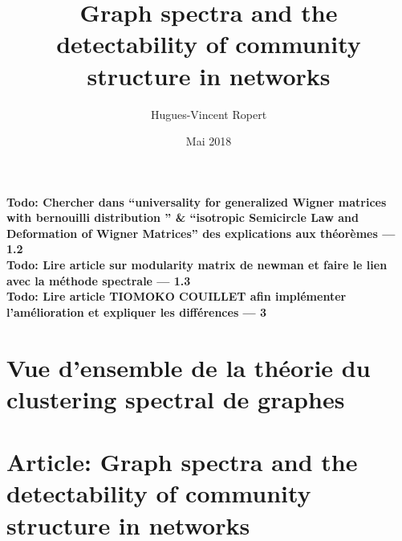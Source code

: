\documentclass{article} %
\title{Graph spectra and the detectability of community structure in networks}
\author{Hugues-Vincent Ropert}
\date{Mai 2018}
\begin{document}
\maketitle

\textbf{Todo: Chercher dans ``universality for generalized Wigner matrices with bernouilli distribution '' \& ``isotropic Semicircle Law and Deformation of Wigner Matrices'' des explications aux théorèmes --- 1.2}\\

\textbf{Todo: Lire article sur modularity matrix de newman et faire le lien avec la méthode spectrale --- 1.3}\\

\textbf{Todo: Lire article TIOMOKO COUILLET afin implémenter l'amélioration et expliquer les différences --- 3}\\
\tableofcontents

\part{Vue d'ensemble de la théorie du clustering spectral de graphes}



\part{Article: Graph spectra and the detectability of community structure in networks}



\nocite{*}


\end{document}
